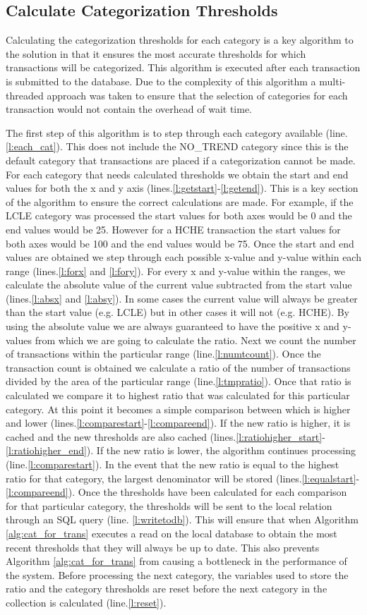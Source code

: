 \subsection{Calculate Categorization Thresholds}
Calculating the categorization thresholds for each category is a key algorithm to the solution in that it ensures the most accurate thresholds for which transactions will be categorized. This algorithm is executed after each transaction is submitted to the database. Due to the complexity of this algorithm a multi-threaded approach was taken to ensure that the selection of categories for each transaction would not contain the overhead of wait time.

The first step of this algorithm is to step through each category available (line.\ref{l:each_cat}). This does not include the NO\_TREND category since this is the default category that transactions are placed if a categorization cannot be made. For each category that needs calculated thresholds we obtain the start and end values for both the x and y axis (lines.\ref{l:getstart}-\ref{l:getend}). This is a key section of the algorithm to ensure the correct calculations are made. For example, if the LCLE category was processed the start values for both axes would be 0 and the end values would be 25. However for a HCHE transaction the start values for both axes would be 100 and the end values would be 75. Once the start and end values are obtained we step through each possible x-value and y-value within each range (lines.\ref{l:forx} and \ref{l:fory}). For every x and y-value within the ranges, we calculate the absolute value of the current value subtracted from the start value (lines.\ref{l:absx} and \ref{l:absy}). In some cases the current value will always be greater than the start value (e.g. LCLE) but in other cases it will not (e.g. HCHE). By using the absolute value we are always guaranteed to have the positive x and y-values from which we are going to calculate the ratio. Next we count the number of transactions within the particular range (line.\ref{l:numtcount}). Once the transaction count is obtained we calculate a ratio of the number of transactions divided by the area of the particular range (line.\ref{l:tmpratio}). Once that ratio is calculated we compare it to highest ratio that was calculated for this particular category. At this point it becomes a simple comparison between which is higher and lower (lines.\ref{l:comparestart}-\ref{l:compareend}). If the new ratio is higher, it is cached and the new thresholds are also cached (lines.\ref{l:ratiohigher_start}-\ref{l:ratiohigher_end}). If the new ratio is lower, the algorithm continues processing (line.\ref{l:comparestart}). In the event that the new ratio is equal to the highest ratio for that category, the largest denominator will be stored (lines.\ref{l:equalstart}-\ref{l:compareend}). Once the thresholds have been calculated for each comparison for that particular category, the thresholds will be sent to the local relation through an SQL query (line. \ref{l:writetodb}). This will ensure that when Algorithm \ref{alg:cat_for_trans} executes a read on the local database to obtain the most recent thresholds that they will always be up to date. This also prevents Algorithm \ref{alg:cat_for_trans} from causing a bottleneck in the performance of the system. Before processing the next category, the variables used to store the ratio and the category thresholds are reset before the next category in the collection is calculated (line.\ref{l:reset}).